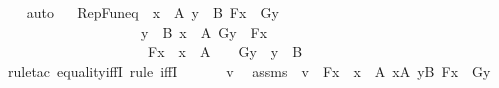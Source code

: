 \begin{isabellebody}
%
\isadelimproof
\ \ %
\endisadelimproof
%
\isatagproof
{}\isamarkupfalse%
\ auto%
\endisatagproof
{\isafoldproof}%
%
\isadelimproof
\ \isanewline
%
\endisadelimproof
\isanewline
{}\isamarkupfalse%
\ RepFun{\isacharunderscore}{\kern0pt}eq\ {\isacharcolon}{\kern0pt}\ {\isachardoublequoteopen}{\isasymforall}x\ {\isasymin}\ A{\isachardot}{\kern0pt}\ {\isacharparenleft}{\kern0pt}{\isasymexists}y\ {\isasymin}\ B{\isachardot}{\kern0pt}\ F{\isacharparenleft}{\kern0pt}x{\isacharparenright}{\kern0pt}\ {\isacharequal}{\kern0pt}\ G{\isacharparenleft}{\kern0pt}y{\isacharparenright}{\kern0pt}{\isacharparenright}{\kern0pt}\isanewline
\ \ \ \ \ \ \ \ \ \ \ \ \ \ \ \ \ \ \ {\isasymLongrightarrow}\ {\isasymforall}y\ {\isasymin}\ B{\isachardot}{\kern0pt}\ {\isacharparenleft}{\kern0pt}{\isasymexists}x\ {\isasymin}\ A{\isachardot}{\kern0pt}\ G{\isacharparenleft}{\kern0pt}y{\isacharparenright}{\kern0pt}\ {\isacharequal}{\kern0pt}\ F{\isacharparenleft}{\kern0pt}x{\isacharparenright}{\kern0pt}{\isacharparenright}{\kern0pt}\isanewline
\ \ \ \ \ \ \ \ \ \ \ \ \ \ \ \ \ \ \ {\isasymLongrightarrow}\ {\isacharbraceleft}{\kern0pt}\ F{\isacharparenleft}{\kern0pt}x{\isacharparenright}{\kern0pt}\ {\isachardot}{\kern0pt}\ x\ {\isasymin}\ A\ {\isacharbraceright}{\kern0pt}\ {\isacharequal}{\kern0pt}\ {\isacharbraceleft}{\kern0pt}\ G{\isacharparenleft}{\kern0pt}y{\isacharparenright}{\kern0pt}\ {\isachardot}{\kern0pt}\ y\ {\isasymin}\ B{\isacharbraceright}{\kern0pt}\ {\isachardoublequoteclose}\ \isanewline
%
\isadelimproof
\ \ %
\endisadelimproof
%
\isatagproof
{}\isamarkupfalse%
\ {\isacharparenleft}{\kern0pt}rule{\isacharunderscore}{\kern0pt}tac\ equality{\isacharunderscore}{\kern0pt}iffI{\isacharsemicolon}{\kern0pt}\ rule\ iffI{\isacharparenright}{\kern0pt}\isanewline
{}\isamarkupfalse%
\ {\isacharminus}{\kern0pt}\ \isanewline
\ \ \isamarkupfalse%
\ v\ \isamarkupfalse%
\ assms\ {\isacharcolon}{\kern0pt}\ {\isachardoublequoteopen}v\ {\isasymin}\ {\isacharbraceleft}{\kern0pt}F{\isacharparenleft}{\kern0pt}x{\isacharparenright}{\kern0pt}\ {\isachardot}{\kern0pt}\ x\ {\isasymin}\ A{\isacharbraceright}{\kern0pt}{\isachardoublequoteclose}\ {\isachardoublequoteopen}{\isasymforall}x{\isasymin}A{\isachardot}{\kern0pt}\ {\isasymexists}y{\isasymin}B{\isachardot}{\kern0pt}\ F{\isacharparenleft}{\kern0pt}x{\isacharparenright}{\kern0pt}\ {\isacharequal}{\kern0pt}\ G{\isacharparenleft}{\kern0pt}y{\isacharparenright}{\kern0pt}{\isachardoublequoteclose}\ \isanewline
\ \ \isamarkupfalse%
\ \isamarkupfalse%

\end{isabellebody}
